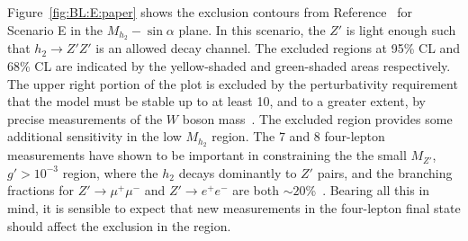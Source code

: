 Figure~\ref{fig:BL:E:paper} shows the exclusion contours from Reference~\cite{BLcontur} for Scenario E in the $M_{h_2}-\sin\alpha$ plane. In this scenario, the $Z'$ is light enough such that $h_2 \rightarrow Z'Z'$ is an allowed decay channel. The excluded regions at 95\% CL and 68\% CL are indicated by the yellow-shaded and green-shaded areas respectively. The upper right portion of the plot is excluded by the perturbativity requirement that the model must be stable up to at least \unit{10}{\TeV}, and to a greater extent, by precise measurements of the $W$ boson mass~\cite{BLcontur}. The \contur excluded region provides some additional sensitivity in the low $M_{h_2}$ region. The \unit{7}{\TeV} and \unit{8}{\TeV} four-lepton measurements have shown to be important in constraining the the small $M_{Z'}$, $g'>10^{-3}$ region, where the $h_2$ decays dominantly to $Z'$ pairs, and the branching fractions for $Z'\rightarrow\mu^+\mu^-$ and $Z'\rightarrow e^+e^-$ are both $\sim20$\%~\cite{BLcontur}. Bearing all this in mind, it is sensible to expect that new measurements in the four-lepton final state should affect the exclusion in the region.

